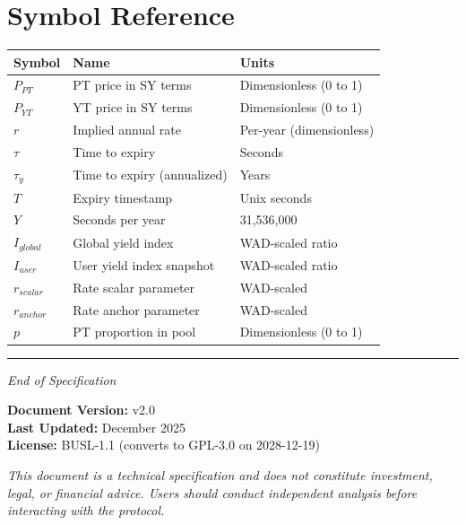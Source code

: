 \section*{Symbol Reference}

\begin{center}
\begin{tabular}{l l l}
\toprule
\textbf{Symbol} & \textbf{Name} & \textbf{Units} \\
\midrule
$P_{PT}$ & PT price in SY terms & Dimensionless (0 to 1) \\
$P_{YT}$ & YT price in SY terms & Dimensionless (0 to 1) \\
$r$ & Implied annual rate & Per-year (dimensionless) \\
$\tau$ & Time to expiry & Seconds \\
$\tau_y$ & Time to expiry (annualized) & Years \\
$T$ & Expiry timestamp & Unix seconds \\
$Y$ & Seconds per year & 31,536,000 \\
$I_{global}$ & Global yield index & WAD-scaled ratio \\
$I_{user}$ & User yield index snapshot & WAD-scaled ratio \\
$r_{scalar}$ & Rate scalar parameter & WAD-scaled \\
$r_{anchor}$ & Rate anchor parameter & WAD-scaled \\
$p$ & PT proportion in pool & Dimensionless (0 to 1) \\
\bottomrule
\end{tabular}
\end{center}

\vspace{2em}

\begin{center}
\rule{0.5\textwidth}{0.4pt}
\end{center}

\vspace{1em}

\begin{center}
\textit{End of Specification}
\end{center}

\vspace{1em}

\noindent\textbf{Document Version:} v2.0\\
\textbf{Last Updated:} December 2025\\
\textbf{License:} BUSL-1.1 (converts to GPL-3.0 on 2028-12-19)

\vspace{1em}

\noindent\textit{This document is a technical specification and does not constitute investment, legal, or financial advice. Users should conduct independent analysis before interacting with the protocol.}
